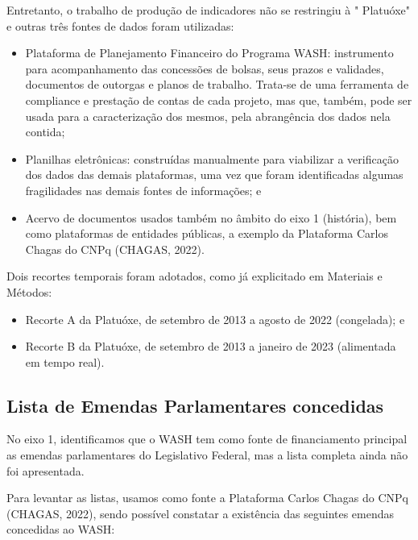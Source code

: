 Entretanto, o trabalho de produção de indicadores não se restringiu à " Platuóxe" e outras três fontes de dados foram utilizadas:


\begin{itemize}
\item Plataforma de Planejamento Financeiro do Programa WASH: instrumento para acompanhamento das concessões de bolsas, seus prazos e validades, documentos de outorgas e planos de trabalho. Trata-se de uma ferramenta de compliance e prestação de contas de cada projeto, mas que, também, pode ser usada para a caracterização dos mesmos, pela abrangência dos dados nela contida;
\item Planilhas eletrônicas: construídas  manualmente para viabilizar a verificação dos dados das demais plataformas, uma vez que foram identificadas algumas fragilidades 
nas demais fontes de informações; e

\item Acervo de documentos usados também no âmbito do eixo 1 (história), bem como plataformas de entidades públicas, a exemplo da Plataforma Carlos Chagas do CNPq (CHAGAS, 2022).
\end{itemize}

Dois recortes temporais foram adotados, como já explicitado em Materiais e Métodos:


\begin{itemize}
\item Recorte A da Platuóxe, de setembro de 2013 a agosto de 2022 (congelada); e
\item Recorte B da Platuóxe, de setembro de 2013 a janeiro de 2023 (alimentada em tempo real).
\end{itemize}

\subsection[Lista de Emendas Parlamentares concedidas]{Lista de Emendas Parlamentares concedidas}\label{Lista de Emendas Parlamentares concedidas}
No eixo 1, identificamos que o WASH tem como fonte de financiamento principal as emendas parlamentares do Legislativo Federal, mas a lista completa ainda não foi apresentada.

Para levantar as listas, usamos como fonte a Plataforma Carlos Chagas do CNPq (CHAGAS, 2022), sendo possível constatar a existência das seguintes emendas concedidas ao WASH:


